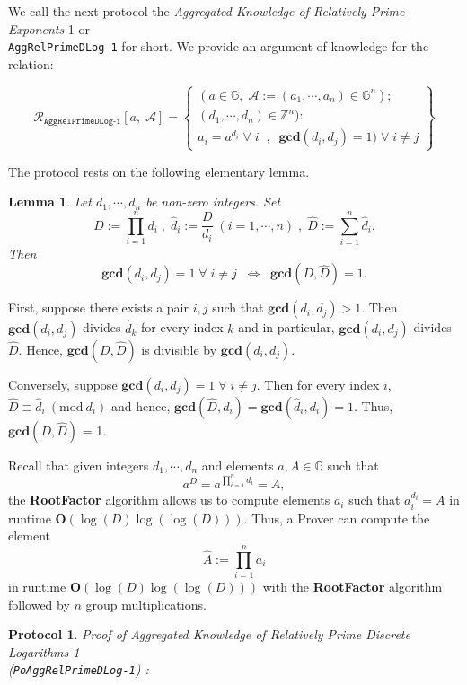 \documentclass[11pt, lettersize, notitlepage, leqno, footskip=0.6cm]{article}
\newcommand{\bz}{\mathbb Z}
\newcommand{\pl}{\prod\limits}
\newcommand{\slim}{\sum\limits}
\newcommand{\ttt}{\texttt}
\newcommand{\LRA}{\Longleftrightarrow}
\newcommand{\mc}{\mathcal}
\newcommand{\mb}{\mathbb}
\newcommand{\mbf}{\mathbf}
\newcommand{\what}{\widehat}
\newcommand{\vs}{\vspace{-0.15cm}}
\newcommand{\noin}{\noindent}
\newcommand{\Mod}[1]{\ (\mathrm{mod}\ #1)}
\newcommand{\GCD}{\mbf{gcd}}
\newtheorem{Lem}[Thm]{Lemma}
\newtheorem{Prot}[Thm]{Protocol}
\numberwithin{equation}{section}
\begin{document}
We call the next protocol the \textit{Aggregated Knowledge of Relatively Prime Exponents} 1 or\\ \verb|AggRelPrimeDLog-1| for short. We provide an argument of knowledge for the relation:

\[
  \mc{R}_{\ttt{AggRelPrimeDLog-1}}[a,\; \mc{A}] = \left\{\begin{array}{l}
    (a\in\mb{G},\;  \mc{A}:=(a_1,\cdots, a_n)\in\mb{G}^n);\\
    (d_1,\cdots,d_n)\in\bz^n): \\
    a_i = a^{d_i}\;\forall\;i\;\;,\;\; \GCD(d_i, d_j) = 1)\;\forall \;i\neq j   	
  \end{array}\right\}
\] 

\noin The protocol rests on the following elementary lemma.

\begin{Lem}\label{lcm} Let $d_1,\cdots,d_n$ be non-zero integers. Set \vs $$D:= \pl_{i=1}^n d_i\;,\; \what{d}_i:= \frac{D}{d_i}\;(i=1,\cdots,n) \;,\;\what{D}:= \slim_{i=1}^n \what{d}_i.$$ Then \vs $$\GCD(d_i,d_j)=1\;\forall\;i\neq j\;\; \LRA \;\; \GCD(D, \what{D}) = 1 .$$\end{Lem}

\begin{prf} First, suppose there exists a pair $i,j$ such that $\GCD(d_i,d_j)> 1$. Then $\GCD(d_i,d_j)$ divides $\what{d}_k$ for every index $k$ and in particular, $\GCD(d_i,d_j)$ divides $\what{D}$. Hence, $\GCD(D,\what{D})$ is divisible by $\GCD(d_i,d_j)$.

Conversely, suppose $\GCD(d_i,d_j)=1\;\forall\;i\neq j$. Then for every index $i$, $\what{D}\equiv \what{d}_i\Mod{d_i} $ and hence, $\GCD(\what{D}, d_i) = \GCD(\what{d}_i, d_i) = 1$. Thus, $\GCD(D,\what{D})$ = 1.\end{prf}

\noin Recall that given integers $d_1,\cdots,d_n$ and elements $a,A\in\mb{G}$ such that \vs $$a^D = a^{\pl_{i=1}^n d_i} = A ,$$ the \textbf{RootFactor} algorithm allows us to compute elements $a_i$ such that $a_i^{d_i} = A$ in runtime $\mbf{O}(\log(D)\log(\log(D)))$. Thus, a Prover can compute the element \vs $$\what{A}:= \pl_{i=1}^n a_i$$ in runtime $\mbf{O}(\log(D)\log(\log(D)))$ with the \textbf{RootFactor} algorithm followed by $n$ group multiplications.

\vspace{0.2cm}

\begin{Prot} \normalfont \textit{Proof of Aggregated Knowledge of Relatively Prime Discrete Logarithms} 1 \\(\verb|PoAggRelPrimeDLog-1|) :\end{Prot} \vspace{-0.3cm}
\end{document}
